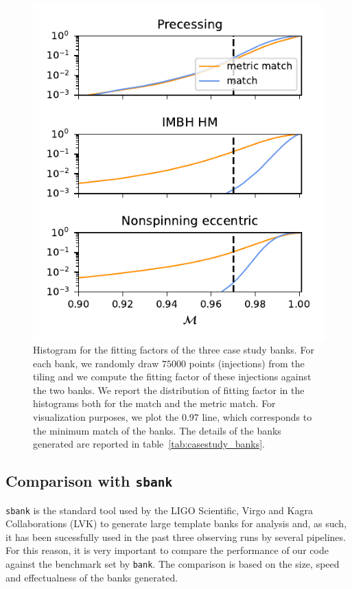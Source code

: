 \documentclass[twocolumn,showpacs,preprintnumbers,nofootinbib,prd,
superscriptaddress,10pt]{revtex4-2}
\newcommand{\stefano}[1]{{\textcolor{blue}{\texttt{SS: #1}} }}
\begin{document}
\begin{figure}[t!]
	\includegraphics{bank_injections}
	\caption{
	Histogram for the fitting factors of the three case study banks. For each bank, we randomly draw $75000$ points (injections) from the tiling and we compute the fitting factor of these injections against the two banks. We report the distribution of fitting factor in the histograms both for the match and the metric match. For visualization purposes, we plot the $0.97$ line, which corresponds to the minimum match of the banks.
	The details of the banks generated are reported in table~\ref{tab:casestudy_banks}.
	}
	\label{fig:bank_injections}
\end{figure}

\subsection{Comparison with \texttt{sbank} }\label{sec:sbank_comparison}

\texttt{sbank} \cite{sbank} is the standard tool used by the LIGO Scientific, Virgo and Kagra Collaborations (LVK) to generate large template banks for analysis and, as such, it has been sucessfully used in the past three observing runs by several pipelines.
For this reason, it is very important to compare the performance of our code against the benchmark set by \texttt{bank}. The comparison is based on the size, speed and effectualness of the banks generated.
\end{document}
